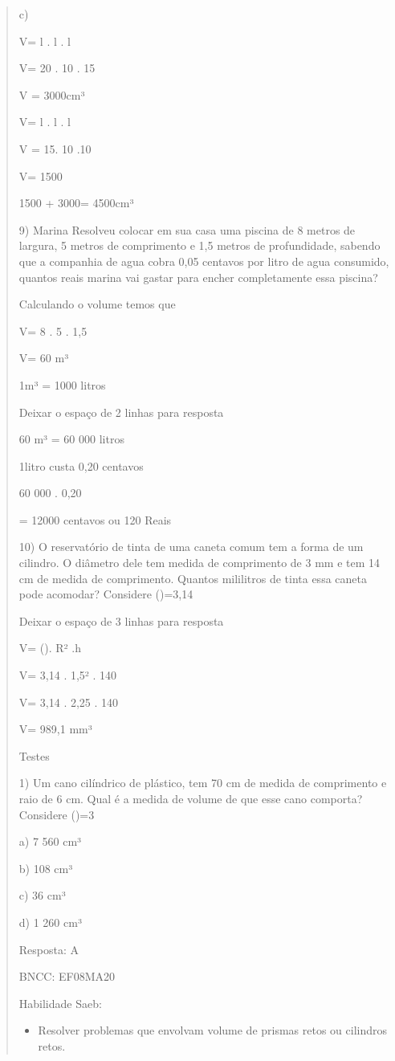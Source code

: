 \begin{quote}
\begin{escolha}
c)

V= l . l . l

V= 20 . 10 . 15

V = 3000cm³

V= l . l . l

V = 15. 10 .10

V= 1500

1500 + 3000= 4500cm³

9) Marina Resolveu colocar em sua casa uma piscina de 8 metros de
largura, 5 metros de comprimento e 1,5 metros de profundidade, sabendo
que a companhia de agua cobra 0,05 centavos por litro de agua consumido,
quantos reais marina vai gastar para encher completamente essa piscina?

Calculando o volume temos que

V= 8 . 5 . 1,5

V= 60 m³

1m³ = 1000 litros

Deixar o espaço de 2 linhas para resposta

60 m³ = 60 000 litros

1litro custa 0,20 centavos

60 000 . 0,20

= 12000 centavos ou 120 Reais

10) O reservatório de tinta de uma caneta comum tem a forma de um
cilindro. O diâmetro dele tem medida de comprimento de 3 mm e tem 14 cm
de medida de comprimento. Quantos mililitros de tinta essa caneta pode
acomodar? Considere (\Pi)=3,14

Deixar o espaço de 3 linhas para resposta

V= (\Pi). R² .h

V= 3,14 . 1,5² . 140

V= 3,14 . 2,25 . 140

V= 989,1 mm³

Testes

1) Um cano cilíndrico de plástico, tem 70 cm de medida de comprimento e
raio de 6 cm. Qual é a medida de volume de que esse cano comporta?
Considere (\Pi)=3

a) 7 560 cm³

b) 108 cm³

c) 36 cm³

d) 1 260 cm³

Resposta: A

BNCC: EF08MA20

Habilidade Saeb:

\begin{itemize}
\tightlist
\item
  Resolver problemas que envolvam volume de prismas retos ou cilindros
  retos.
\end{itemize}


\end{escolha}
\end{quote}
